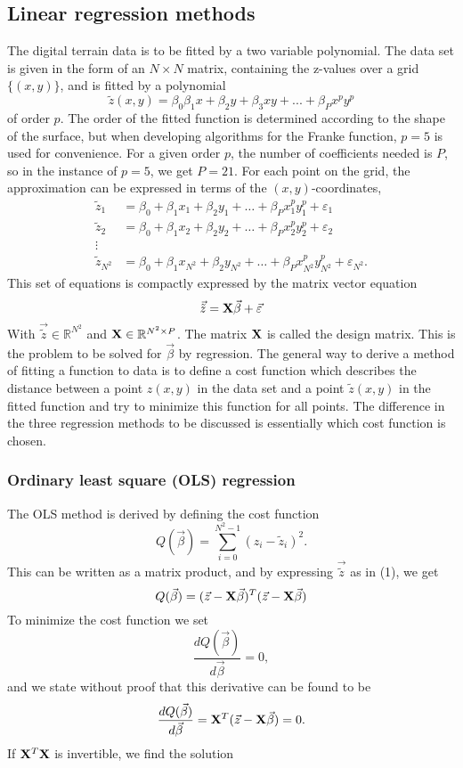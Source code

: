 \documentclass{emulateapj}
\begin{document}
\subsection{Linear regression methods}

The digital terrain data is to be fitted by a two variable polynomial. The data set is given in the form of an $N \times N$ matrix, containing the z-values over a grid $\{(x, y)\}$, and is fitted by a polynomial 
\[\tilde{z}(x, y) =\beta_0 \beta_1 x +  \beta_2 y + \beta_3 xy + ... +  \beta_Px^p y^p \]
of order $p$. The order of the fitted function is determined according to the shape of the surface, but when developing algorithms for the Franke function, $p=5$ is used  for convenience. For a given order $p$, the number of coefficients needed is $P$, so in the instance of $p=5$, we get $P = 21$.  For each point on the grid, the approximation can be expressed in terms of the $(x, y)$-coordinates,
\begin{align*}
\tilde{z}_1&=\beta_0+\beta_1 x_1 + \beta_2y_1 + \hdots+\beta_Px_1^py_1^p +\varepsilon_1\\
\tilde{z}_2&=\beta_0+\beta_1 x_2 + \beta_2y_2 + \hdots+\beta_Px_2^py_2^p +\varepsilon_2\\
\vdots\\
\tilde{z}_{N^2}&=\beta_0+\beta_1 x_{N^2} + \beta_2y_{N^2} + \hdots+\beta_Px_{N^2}^py_{N^2}^p +\varepsilon_{N^2}.
\end{align*}
This set of equations is compactly expressed by the matrix vector equation
\begin{equation} \vec{\tilde{z}}=\bold{X}\vec{\beta}+\vec{\varepsilon} \end{equation}
With $\vec{\tilde{z}} \in \mathbb{R}^{N^2}$ and $\bold{X} \in \mathbb{R}^{N^2 \times P}$. The matrix $\bold{X}$ is called the design matrix.
This is the problem to be solved for $\vec{\beta}$ by regression. The general way to derive a method of fitting a function to data is to define a cost function which describes the distance between a point $ z(x, y)$ in the data set  and a point $\tilde{z}(x, y)$ in the fitted function and try to minimize this function for all points. The difference in the three regression methods to be discussed is essentially which cost function is chosen.
\subsubsection{Ordinary least square (OLS) regression}
 The OLS method is derived by defining the cost function
\[ Q(\vec{\beta}) = \sum_{i = 0}^{N^2 -1} (z_i - \tilde{z}_i )^2.
\]
This can be written as a matrix product, and by expressing $\vec{\tilde{z}}$ as in (1), we get
\[ Q(\vec{\beta}) = (\vec{z} - \bold{X}\vec{\beta})^T(\vec{z} - \bold{X}\vec{\beta})
\]
To minimize the cost function we set
\[\frac{dQ(\vec{\beta})}{ d \vec{\beta}}  = 0,\]
and we state without proof that this derivative can be found to be
\[\frac{dQ(\vec{\beta})}{ d \vec{\beta}}  = \bold{X}^T(\vec{z} - \bold{X}\vec{\beta}) = 0. \]
If  $\bold{X}^T\bold{X}$ is invertible, we find the solution
\end{document}
